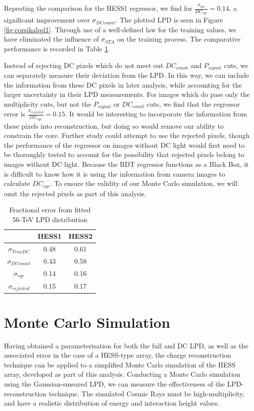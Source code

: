 \documentclass[11pt]{article}
\begin{document}
Repeating the comparison for the HESS1 regressor, we find for $\frac{\sigma_{rgr}}{DC_{rgr}} = 0.14$, a significant improvement over $\sigma_{DCcount}$. The plotted LPD is seen in Figure \ref{fig:corsikalpd1}. Through use of a well-defined law for the training values, we have eliminated the influence of $\sigma_{STA}$ on the training process. The comparative performance is recorded in Table \ref{tab:lpderror}.

Instead of rejecting DC pixels which do not meet out $DC_{count}$ and $P_{signal}$ cuts, we can separately measure their deviation from the LPD. In this way, we can include the information from these DC pixels in later analysis, while accounting for the larger uncertainty in their LPD measurements. For images which do pass only the multiplicity cuts, but not the $P_{signal}$ or $DC_{count}$ cuts, we find that the regressor error is $\frac{\sigma_{rejected}}{DC_{rgr}}=0.15$. It would be interesting to incorporate the information from these pixels into reconstruction, but doing so would remove our ability to constrain the core. Further study could attempt to use the rejected pixels, though the performance of the regressor on images without DC light would first need to be thoroughly tested to account for the possibility that rejected pixels belong to images without DC light. Because the BDT regressor functions as a Black Box, it is difficult to know how it is using the information from camera images to calculate $DC_{rgr}$. To ensure the validity of our Monte Carlo simulation, we will omit the rejected pixels as part of this analysis. 

\begin{table}[h!]
  \centering
  \caption{Fractional error from fitted 56-TeV LPD distribution}
  \label{tab:lpderror}
  \begin{tabular}{ccc}
    \toprule
    & HESS1 & HESS2\\
    \midrule
    $\sigma_{TrueDC}$ & 0.48 & 0.61\\
    $\sigma_{DCcount}$ & 0.43 & 0.58\\
    $\sigma_{rgr}$ & 0.14 & 0.16\\ 
    $\sigma_{rejected}$ & 0.15 & 0.17\\ 
    \bottomrule
  \end{tabular}
\end{table}

\section{Monte Carlo Simulation}
Having obtained a parameterisation for both the full and DC LPD, as well as the associated error in the case of a HESS-type array, the charge reconstruction technique can be applied to a simplified Monte Carlo simulation of the HESS array, developed as part of this analysis. Conducting a Monte Carlo simulation using the Gaussian-smeared LPD, we can measure the effectiveness of the LPD-reconstruction technique. The simulated Cosmic Rays must be high-multiplicity, and have a realistic distribution of energy and interaction height values.
\end{document}
